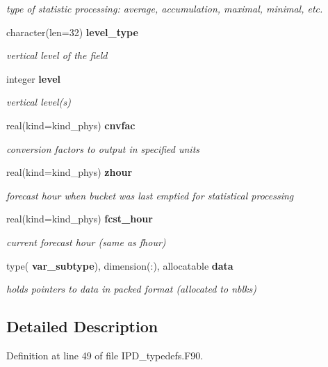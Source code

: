 \begin{DoxyCompactItemize}
\begin{DoxyCompactList}\small\item\em type of statistic processing\+: average, accumulation, maximal, minimal, etc. \end{DoxyCompactList}\item 
character(len=32) \textbf{ level\+\_\+type}
\begin{DoxyCompactList}\small\item\em vertical level of the field \end{DoxyCompactList}\item 
integer \textbf{ level}
\begin{DoxyCompactList}\small\item\em vertical level(s) \end{DoxyCompactList}\item 
real(kind=kind\+\_\+phys) \textbf{ cnvfac}
\begin{DoxyCompactList}\small\item\em conversion factors to output in specified units \end{DoxyCompactList}\item 
real(kind=kind\+\_\+phys) \textbf{ zhour}
\begin{DoxyCompactList}\small\item\em forecast hour when bucket was last emptied for statistical processing \end{DoxyCompactList}\item 
real(kind=kind\+\_\+phys) \textbf{ fcst\+\_\+hour}
\begin{DoxyCompactList}\small\item\em current forecast hour (same as fhour) \end{DoxyCompactList}\item 
type(\textbf{ var\+\_\+subtype}), dimension(\+:), allocatable \textbf{ data}
\begin{DoxyCompactList}\small\item\em holds pointers to data in packed format (allocated to nblks) \end{DoxyCompactList}\end{DoxyCompactItemize}


\subsection{Detailed Description}


Definition at line 49 of file I\+P\+D\+\_\+typedefs.\+F90.




